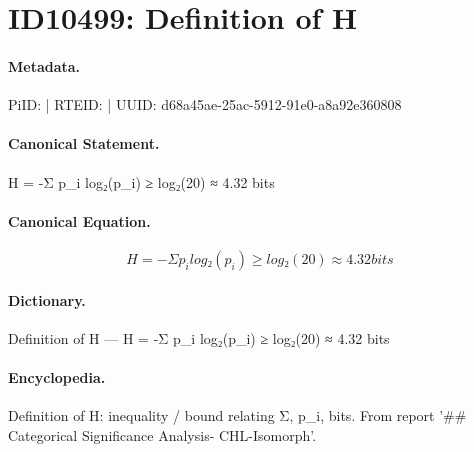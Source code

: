 \section*{ID10499: Definition of H}
\paragraph{Metadata.}
PiID:  | RTEID:  | UUID: d68a45ae-25ac-5912-91e0-a8a92e360808

\paragraph{Canonical Statement.}
H = -Σ p\_i log₂(p\_i) ≥ log₂(20) ≈ 4.32 bits

\paragraph{Canonical Equation.}
\[
H = -Σ p_i log₂(p_i) ≥ log₂(20) ≈ 4.32 bits
\]

\paragraph{Dictionary.}
Definition of H — H = -Σ p\_i log₂(p\_i) ≥ log₂(20) ≈ 4.32 bits

\paragraph{Encyclopedia.}
Definition of H: inequality / bound relating Σ, p\_i, bits. From report '\#\# Categorical Significance Analysis- CHL-Isomorph'.
